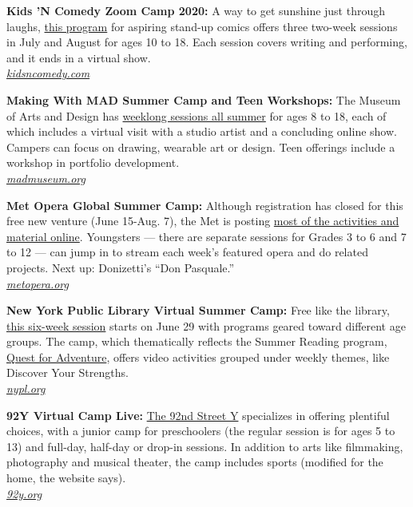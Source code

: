 \textbf{Kids 'N Comedy Zoom Camp 2020:} A way to get sunshine just
through laughs, \href{https://www.kidsncomedy.com/programs}{this
program} for aspiring stand-up comics offers three two-week sessions in
July and August for ages 10 to 18. Each session covers writing and
performing, and it ends in a virtual show.\\
\href{https://www.kidsncomedy.com/}{\emph{kidsncomedy.com}}

\textbf{Making With MAD Summer Camp and Teen Workshops:} The Museum of
Arts and Design has
\href{https://madmuseum.org/learn/summer-camp-and-teen-workshops}{weeklong
sessions all summer} for ages 8 to 18, each of which includes a virtual
visit with a studio artist and a concluding online show. Campers can
focus on drawing, wearable art or design. Teen offerings include a
workshop in portfolio development.\\
\href{https://madmuseum.org/}{\emph{madmuseum.org}}

\textbf{Met Opera Global Summer Camp:} Although registration has closed
for this free new venture (June 15-Aug. 7), the Met is posting
\href{https://www.metopera.org/discover/education/global-summer-camp/home/}{most
of the activities and material online}. Youngsters --- there are
separate sessions for Grades 3 to 6 and 7 to 12 --- can jump in to
stream each week's featured opera and do related projects. Next up:
Donizetti's ``Don Pasquale.''\\
\href{https://www.metopera.org/}{\emph{metopera.org}}

\textbf{New York Public Library Virtual Summer Camp:} Free like the
library, \href{https://www.nypl.org/125/summerreading/camp}{this
six-week session} starts on June 29 with programs geared toward
different age groups. The camp, which thematically reflects the Summer
Reading program, \href{https://www.nypl.org/125/summerreading}{Quest for
Adventure}, offers video activities grouped under weekly themes, like
Discover Your Strengths.\\
\href{https://www.nypl.org/}{\emph{nypl.org}}

\textbf{92Y Virtual Camp Live:}
\href{https://www.92y.org/virtual-camp-live}{The 92nd Street Y}
specializes in offering plentiful choices, with a junior camp for
preschoolers (the regular session is for ages 5 to 13) and full-day,
half-day or drop-in sessions. In addition to arts like filmmaking,
photography and musical theater, the camp includes sports (modified for
the home, the website says).\\
\href{https://www.92y.org/}{\emph{92y.org}}


